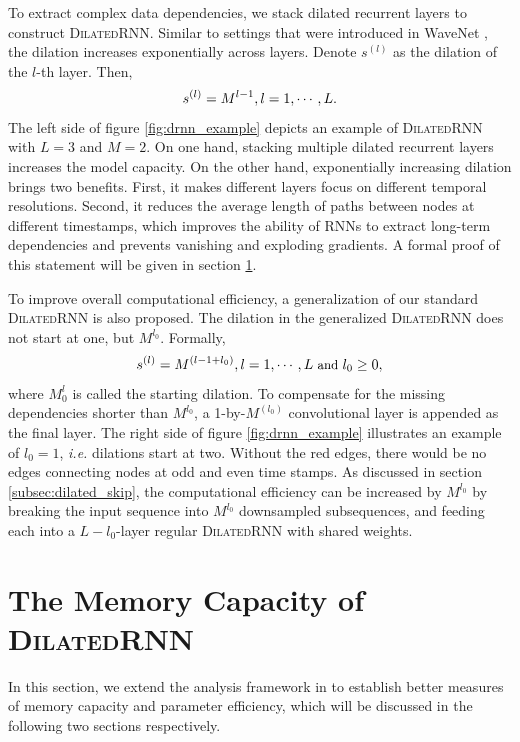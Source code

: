 \documentclass{article}
\newcommand{\algname}{\textsc{DilatedRNN }}
\newcommand{\algnamens}{\textsc{DilatedRNN}}
\begin{document}
To extract complex data dependencies, we stack dilated recurrent layers to construct \algnamens.  Similar to settings that were introduced in WaveNet \cite{van2016wavenet}, the dilation increases exponentially across layers. Denote {\small$s^{(l)}$} as the dilation of the $l$-th layer. Then,
\begin{equation}
\small
s^{(l)} = M^{l-1}, l = 1, \cdots, L.
\label{eq:skip_distribution}
\end{equation}
The left side of figure \ref{fig:drnn_example} depicts an example of \algname with $L=3$ and $M = 2$.  On one hand,  stacking multiple dilated recurrent layers increases the model capacity.  On the other hand, exponentially increasing dilation brings two benefits. First, it makes different layers focus on different temporal resolutions.  Second, it reduces the average length of paths between nodes at different timestamps, which improves the ability of RNNs to extract long-term dependencies and prevents vanishing and exploding gradients.  A formal proof of this statement will be given in section \ref{sect:complexity}.

To improve overall computational efficiency, a generalization of our standard \algname is also proposed. The dilation in the generalized \algname does not start at one, but {\small$M^{l_0}$}.  Formally,
\begin{equation}
\small
s^{(l)} = M^{(l-1+l_0)}, l = 1, \cdots, L \text{ and } l_0 \ge 0, 
\label{eq:drnn_general}
\end{equation}
where {\small$M^l_0$} is called the starting dilation. To compensate for the missing dependencies shorter than {\small$M^{l_0}$}, a 1-by-{\small$M^{(l_0)}$} convolutional layer is appended as the final layer. 
 The right side of figure \ref{fig:drnn_example} illustrates an example of $l_0 = 1$, \emph{i.e.} dilations start at two.  Without the red edges, there would be no edges connecting nodes at odd and even time stamps. As discussed in section \ref{subsec:dilated_skip}, the computational efficiency can be increased by {\small$M^{l_0}$} by breaking the input sequence into {\small$M^{l_0}$} downsampled subsequences, and feeding each into a $L-l_0$-layer regular \algname with shared weights. 

\section{The Memory Capacity of \algname}
\label{sect:complexity}
In this section, we extend the analysis framework in \cite{zhang2016architectural} to establish better measures of memory capacity and parameter efficiency, which will be discussed in the following two sections respectively.
\end{document}
